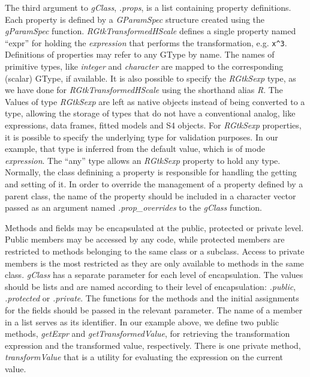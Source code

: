 \documentclass[article]{jss}
\begin{document}
The third argument to \emph{gClass}, \emph{.props}, is a list containing property definitions.
Each property is defined by a \emph{GParamSpec} structure created
using the 
\emph{gParamSpec} function. \emph{RGtkTransformedHScale} defines a
single 
property named ``expr'' for holding the  \emph{expression}
that 
performs the transformation, e.g. \verb+x^3+. Definitions of
properties may refer to any GType by name. 
The names of primitive  types, like \emph{integer} and
\emph{character} 
are mapped to the corresponding (scalar) GType, if available. 
It is also
possible to specify the 
\emph{RGtkSexp} type, as we have done for
\emph{RGtkTransformedHScale} using the shorthand alias \emph{R}.  The
Values of type \emph{RGtkSexp} are left
as native  objects instead of being converted to a
 type, allowing the storage of  types that do
not have a conventional  analog, like expressions, data
frames, fitted models and S4 objects. For \emph{RGtkSexp} properties,
it is possible to specify the underlying  type for
validation purposes. In our example, that type is inferred from the
default value, which is of mode 
\emph{expression}.  The ``any'' type
allows an \emph{RGtkSexp} property to hold any  type.
Normally, the class definining a property is responsible for handling the getting and setting of it. In order to override the management of a property defined by a parent class, the name of the property should be included in a character vector passed as an argument named \emph{.prop\_overrides} to the \emph{gClass} function.


Methods and fields may be encapsulated at the public, protected or
private level.  Public members may be accessed by any code, while
protected members are restricted to methods belonging to the same
class or a subclass. Access to private members is the most restricted
as they are only available to methods in the same class. \emph{gClass}
has a separate parameter for each level of encapsulation. The
values should be lists and are named according to their level of encapsulation:
\emph{.public}, \emph{.protected} or \emph{.private}.  The functions
for the methods and the initial assignments for the fields should be
passed in the relevant parameter. The name of a member in a list
serves as its identifier. In our example above, we define two public
methods, \emph{getExpr} and \emph{getTransformedValue}, for retrieving
the transformation expression and the transformed value,
respectively. There is one private method, \emph{transformValue} that
is a utility for evaluating the expression on the current value.
\end{document}
